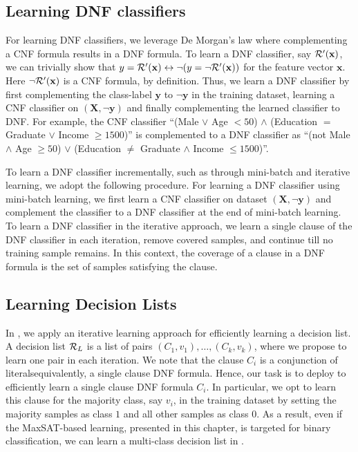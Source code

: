 \subsection{Learning DNF classifiers} 
\label{interpretability_imli_sec:dnf_learning}
For learning DNF classifiers, we leverage De Morgan's law where complementing a CNF formula results in a DNF formula. To learn a DNF classifier, say $ {\mathcal{R}}'(\mathbf{x}) $, we can trivially show that $ y = {\mathcal{R}}'(\mathbf{x}) \leftrightarrow \neg (y = \neg {\mathcal{R}}'(\mathbf{x})) $ for the feature vector $ \mathbf{x} $. Here $ \neg {\mathcal{R}}'(\mathbf{x}) $ is a CNF formula, by definition. Thus, we learn a DNF classifier by first complementing the class-label $ \mathbf{y} $ to $ \neg \mathbf{y}$ in the training dataset, learning a CNF classifier on $ (\mathbf{X}, \neg \mathbf{y}) $ and finally complementing the learned classifier to DNF. For example, the CNF classifier  ``(Male $ \vee $ Age $ < 50 $) $ \wedge $ (Education $ = $ Graduate $ \vee $ Income  $ \ge 1500 $)'' 	is complemented to a DNF classifier as 	 ``(not Male $ \wedge $ Age $ \ge 50 $) $ \vee $ (Education $ \ne $ Graduate $ \wedge $ Income $ \le 1500 $)''. 


To learn a DNF classifier incrementally, such as through mini-batch and iterative learning, we adopt the following procedure. For learning a DNF classifier using mini-batch learning, we first learn a CNF classifier on dataset $ (\mathbf{X}, \neg \mathbf{y}) $ and complement the classifier to a DNF classifier at the end of mini-batch learning. To learn a DNF classifier in the iterative approach, we  learn a single clause of the DNF classifier in each iteration, remove covered samples, and continue till no training sample remains. In this context, the coverage of a clause in a DNF formula is the set of samples satisfying the clause. 



\subsection{Learning Decision Lists}
In {\imli}, we apply an iterative learning approach for efficiently learning a  decision list. A decision list  $ {\mathcal{R}}_L $ is a list of pairs $ (C_1, v_1), \dots, (C_k, v_k) $, where we propose to learn one pair in each iteration.  We note that the clause $ C_i $ is a conjunction of literals\textemdash equivalently, a single clause DNF formula. Hence, our task is to deploy {\imli} to efficiently learn a single clause DNF formula $ C_i $. In particular, we opt to learn this clause for the majority class, say $ v_i $, in the training dataset by setting the majority samples as class $ 1 $ and all other samples as class $ 0 $. As a result, even if the MaxSAT-based learning, presented in this chapter, is targeted for binary classification, we can learn a multi-class decision list in {\imli}. 


